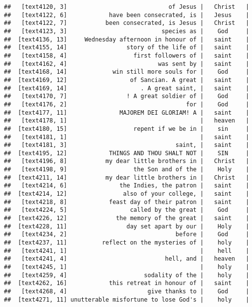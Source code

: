 \documentclass[]{article}
\begin{document}
\begin{verbatim}
##   [text4120, 3]                             of Jesus |   Christ   |
##   [text4122, 6]            have been consecrated, is |   Jesus    |
##   [text4122, 7]           been consecrated, is Jesus |   Christ   |
##   [text4123, 3]                           species as |    God     |
##  [text4136, 13]     Wednesday afternoon in honour of |   saint    |
##  [text4155, 14]                 story of the life of |   saint    |
##   [text4158, 4]                   first followers of |   saint    |
##   [text4162, 4]                          was sent by |   saint    |
##  [text4168, 14]             win still more souls for |    God     |
##  [text4169, 12]                  of Sancian. A great |   saint    |
##  [text4169, 14]                     . A great saint, |   saint    |
##   [text4170, 7]                 ! A great soldier of |    God     |
##   [text4176, 2]                                  for |    God     |
##  [text4177, 11]               MAJOREM DEI GLORIAM! A |   saint    |
##   [text4178, 1]                                      |   heaven   |
##  [text4180, 15]                   repent if we be in |    sin     |
##   [text4181, 1]                                      |   saint    |
##   [text4181, 3]                               saint, |   saint    |
##  [text4195, 12]            THINGS AND THOU SHALT NOT |    SIN     |
##   [text4196, 8]           my dear little brothers in |   Christ   |
##   [text4198, 9]                   the Son and of the |    Holy    |
##  [text4211, 14]           my dear little brothers in |   Christ   |
##   [text4214, 6]               the Indies, the patron |   saint    |
##  [text4214, 12]                also of your college, |   saint    |
##   [text4218, 8]            feast day of their patron |   saint    |
##   [text4224, 5]                  called by the great |    God     |
##  [text4226, 12]              the memory of the great |   saint    |
##  [text4228, 11]                 day set apart by our |    Holy    |
##   [text4234, 2]                               before |    God     |
##  [text4237, 11]          reflect on the mysteries of |    holy    |
##   [text4241, 1]                                      |    hell    |
##   [text4241, 4]                            hell, and |   heaven   |
##   [text4245, 1]                                      |    holy    |
##   [text4259, 4]                      sodality of the |    holy    |
##  [text4262, 16]            this retreat in honour of |   saint    |
##   [text4268, 4]                       give thanks to |    God     |
##  [text4271, 11] unutterable misfortune to lose God's |    holy    |

\end{verbatim}
\end{document}
